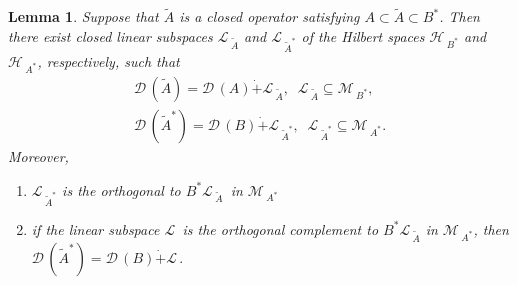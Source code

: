 \documentclass[12pt]{amsart}
\newtheorem{lem}[thm]{Lemma}
\theoremstyle{definition}
\newcommand{\cM}{\mathcal{M}\,}
\newcommand{\cL}{\mathcal{L}\,}
\newcommand{\cD}{\mathcal{D}\,}
\newcommand{\cH}{\mathcal{H}\,}
\begin{document}
\begin{lem}\label{kvit25ab}
Suppose that $\widetilde A$ is a closed operator satisfying $A\subset\widetilde A\subset B^*$. Then there exist closed linear subspaces $\cL_{\widetilde A}$ and $\cL_{\widetilde A^*}$  of the Hilbert spaces $\cH_{B^*}$ and $\cH_{A^*}$, respectively, such that
\begin{equation}\label{cherv20aa}
\begin{array}{l}
\cD( \widetilde A)=\cD( A)\dot +
\cL_{\widetilde A}, \;\;\cL_{\widetilde A}\subseteq\cM_{B^*},\\[2mm]
\cD( \widetilde A^*)=\cD( B)\dot +
\cL_{\widetilde A^*}, \;\;\cL_{\widetilde A^*}\subseteq\cM_{A^*}.
\end{array}
\end{equation}
Moreover,
\begin{enumerate}
\item  $\cL_{\widetilde A^*}$ is the orthogonal to $B^*\cL_{\widetilde A}$\, in $\cM_{A^*}$
\item  if the linear subspace $\cL $ is the orthogonal complement to $B^*\cL_{\widetilde A}$ in $\cM_{A^*}$,
then $\cD(\widetilde A^*)=\cD(B)\dot+\cL.$
\end{enumerate}
\end{lem}
\end{document}
